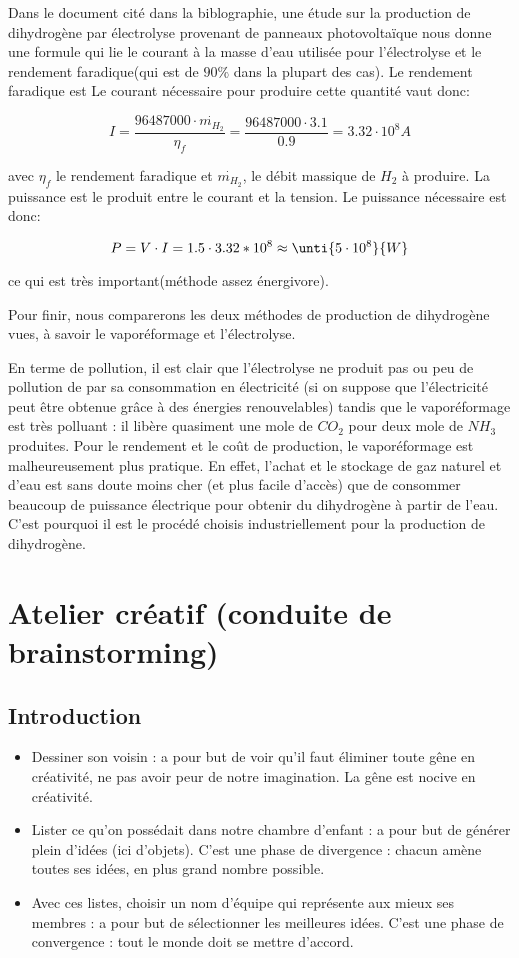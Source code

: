 Dans le document cité dans la biblographie, une étude sur la production
de dihydrogène par électrolyse provenant de panneaux photovoltaïque nous
donne une formule qui lie le courant à la masse d'eau utilisée pour
l'électrolyse et le rendement faradique(qui est de $90\%$ dans la plupart des cas).
Le rendement faradique est Le courant nécessaire pour produire cette quantité vaut donc:

$$I = \frac{96487000\cdot {\dot{m_{H_{2}}}}}{\eta_{f}} = \frac{96487000\cdot 3.1}{0.9} =  \unit{3.32\cdot 10^{8}}{A}$$

avec $\eta_{f}$ le rendement faradique et $\dot{m_{H_{2}}}$, le débit massique
de $H_{2}$ à produire. La puissance est le produit entre le courant et la 
tension. Le puissance nécessaire est donc:

$$P = V\cdot I = 1.5\cdot 3.32*10^{8} \approx \unti{5\cdot 10^{8}}{W}$$

ce qui est très important(méthode assez énergivore).

Pour finir, nous comparerons les deux méthodes de production de 
dihydrogène vues, à savoir le vaporéformage et l'électrolyse.

En terme de pollution, il est clair que l'électrolyse ne produit 
pas ou peu de pollution de par sa consommation en électricité 
(si on suppose que l'électricité peut être obtenue grâce à des énergies renouvelables)
tandis que le vaporéformage est très polluant : il libère quasiment une mole de $CO_{2}$
pour deux mole de $NH_{3}$ produites. Pour le rendement et le coût de production, 
le vaporéformage est malheureusement plus pratique. En effet, l'achat et le stockage
de gaz naturel et d'eau est sans doute moins cher (et plus facile d'accès) que 
de consommer beaucoup de puissance électrique pour obtenir du dihydrogène à partir
de l'eau. C'est pourquoi il est le procédé choisis industriellement pour la production
de dihydrogène.

\section{Atelier créatif (conduite de brainstorming)}
\subsection{Introduction}
\begin{itemize}
\item Dessiner son voisin : a pour but de voir qu'il faut éliminer toute gêne en 
créativité, ne pas avoir peur de notre imagination. La gêne est nocive en créativité.
\item Lister ce qu'on possédait dans notre chambre d'enfant : a pour but de générer
plein d'idées (ici d'objets). C'est une phase de divergence : chacun amène toutes
ses idées, en plus grand nombre possible.
\item Avec ces listes, choisir un nom d'équipe qui représente aux mieux ses membres
: a pour but de sélectionner les meilleures idées. C'est une phase de convergence :
tout le monde doit se mettre d'accord.
\end{itemize}

